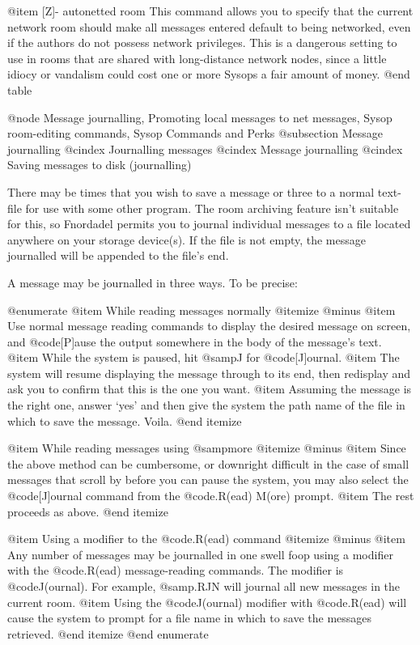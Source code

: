 @item [Z]- autonetted room
This command allows you to specify that the current
network room should make all messages entered default to
being networked, even if the authors do not possess network
privileges.  This is a dangerous setting to use in rooms that
are shared with long-distance network nodes, since a little
idiocy or vandalism could cost one or more Sysops a fair
amount of money.
@end table

@node Message journalling, Promoting local messages to net messages, Sysop room-editing commands, Sysop Commands and Perks
@subsection Message journalling
@cindex Journalling messages
@cindex Message journalling
@cindex Saving messages to disk (journalling)

There may be times that you wish to save a message or three
to a normal text-file for use with some other program.  The room
archiving feature isn't suitable for this, so Fnordadel permits
you to journal individual messages to a file located anywhere on
your storage device(s).  If the file is not empty, the message
journalled will be appended to the file's end.

A message may be journalled in three ways.  To be precise:

@enumerate
@item
While reading messages normally
@itemize @minus
@item
Use normal message reading commands to display the
desired message on screen, and @code{[P]ause} the output
somewhere in the body of the message's text.
@item
While the system is paused, hit @samp{J} for @code{[J]ournal}.
@item
The system will resume displaying the message through
to its end, then redisplay and ask you to confirm that
this is the one you want.
@item
Assuming the message is the right one, answer `yes' and
then give the system the path name of the file in which
to save the message.  Voila.
@end itemize

@item
While reading messages using @samp{more}
@itemize @minus
@item
Since the above method can be cumbersome, or downright
difficult in the case of small messages that scroll by
before you can pause the system, you may also select
the @code{[J]ournal} command from the @code{.R(ead) M(ore)} prompt.
@item
The rest proceeds as above.
@end itemize

@item
Using a modifier to the @code{.R(ead)} command
@itemize @minus
@item
Any number of messages may be journalled in one swell
foop using a modifier with the @code{.R(ead)} message-reading
commands.  The modifier is @code{J(ournal)}.  For example, @samp{.RJN}
will journal all new messages in the current room.
@item
Using the @code{J(ournal)} modifier with @code{.R(ead)} will cause
the system to prompt for a file name in which to save
the messages retrieved.
@end itemize
@end enumerate

